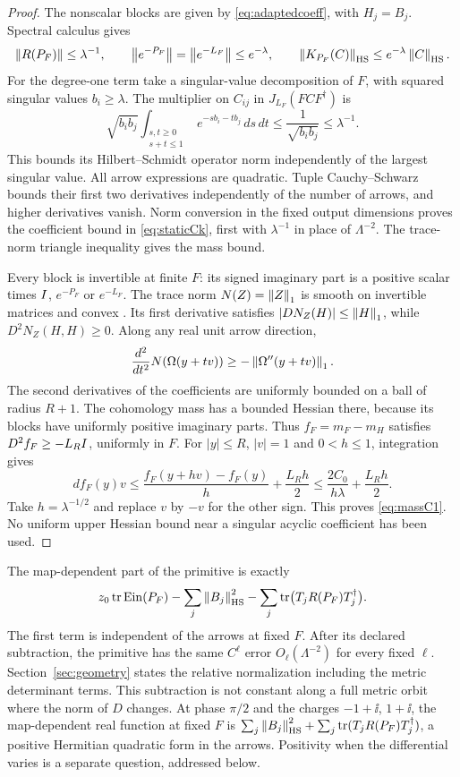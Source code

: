 \begin{proof}
The nonscalar blocks are given by \eqref{eq:adaptedcoeff}, with
$H_j=B_j$. Spectral calculus gives
\[
 \left\lVert R(P_F)\right\rVert\leq\lambda^{-1},\qquad
 \left\lVert e^{-P_F}\right\rVert=\left\lVert e^{-L_F}\right\rVert\leq e^{-\lambda},\qquad
 \left\lVert K_{P_F}(C)\right\rVert_{\mathrm{HS}}\leq e^{-\lambda}\left\lVert C\right\rVert_{\mathrm{HS}}.
\]
For the degree-one term take a singular-value decomposition of $F$,
with squared singular values $b_i\geq\lambda$. The multiplier on
$C_{ij}$ in $J_{L_F}(FCF^\dagger)$ is
\[
 \sqrt{b_ib_j}\int_{\substack{s,t\geq0\\s+t\leq1}}
 e^{-sb_i-tb_j}\,ds\,dt
 \leq\frac1{\sqrt{b_ib_j}}\leq\lambda^{-1}.
\]
This bounds its Hilbert--Schmidt operator norm independently of the
largest singular value. All arrow expressions are quadratic.
Tuple Cauchy--Schwarz bounds their first two derivatives independently
of the number of arrows, and higher derivatives vanish. Norm conversion
in the fixed output dimensions proves the coefficient bound in
\eqref{eq:staticCk}, first with $\lambda^{-1}$ in place of $\Lambda^{-2}$.
The trace-norm triangle inequality gives the mass bound.

Every block is invertible at finite $F$: its signed imaginary part is
a positive scalar times $I$, $e^{-P_F}$ or $e^{-L_F}$.
The trace norm $N(Z)=\left\lVert Z\right\rVert_1$ is smooth on invertible matrices and
convex \cite{lewis95}. Its first derivative satisfies
$|DN_Z(H)|\leq\left\lVert H\right\rVert_1$, while $D^2N_Z(H,H)\geq0$.
Along any real unit arrow direction,
\[
 \frac{d^2}{dt^2}N(\Omega(y+tv))\geq-\left\lVert\Omega''(y+tv)\right\rVert_1.
\]
The second derivatives of the coefficients are uniformly bounded on a
ball of radius $R+1$. The cohomology mass has a bounded Hessian there,
because its blocks have uniformly positive imaginary parts.
Thus $f_F=m_F-m_H$ satisfies $D^2f_F\geq-L_RI$, uniformly in $F$.
For $|y|\leq R$, $|v|=1$ and $0<h\leq1$, integration gives
\[
 df_F(y)v\leq\frac{f_F(y+hv)-f_F(y)}h+\frac{L_Rh}{2}
 \leq\frac{2C_0}{h\lambda}+\frac{L_Rh}{2}.
\]
Take $h=\lambda^{-1/2}$ and replace $v$ by $-v$ for the other sign.
This proves \eqref{eq:massC1}. No uniform upper Hessian bound near a
singular acyclic coefficient has been used.
\end{proof}

The map-dependent part of the primitive is exactly
\begin{equation}\label{eq:staticprimitive}
 z_0\operatorname{tr}\operatorname{Ein}(P_F)-\sum_j\left\lVert B_j\right\rVert_{\mathrm{HS}}^2
 -\sum_j\operatorname{tr}\bigl(T_jR(P_F)T_j^\dagger\bigr).
\end{equation}
The first term is independent of the arrows at fixed $F$.
After its declared subtraction, the primitive has the same
$C^\ell$ error $O_\ell(\Lambda^{-2})$ for every fixed $\ell$.
Section~\ref{sec:geometry} states the relative normalization including
the metric determinant terms. This subtraction is not constant along
a full metric orbit where the norm of $D$ changes.
At phase $\pi/2$ and the charges $-1+\ii$, $1+\ii$, the map-dependent
real function at fixed $F$ is
$\sum_j\left\lVert B_j\right\rVert_{\mathrm{HS}}^2+\sum_j\operatorname{tr}(T_jR(P_F)T_j^\dagger)$,
a positive Hermitian quadratic form in the arrows. Positivity when the
differential varies is a separate question, addressed below.


